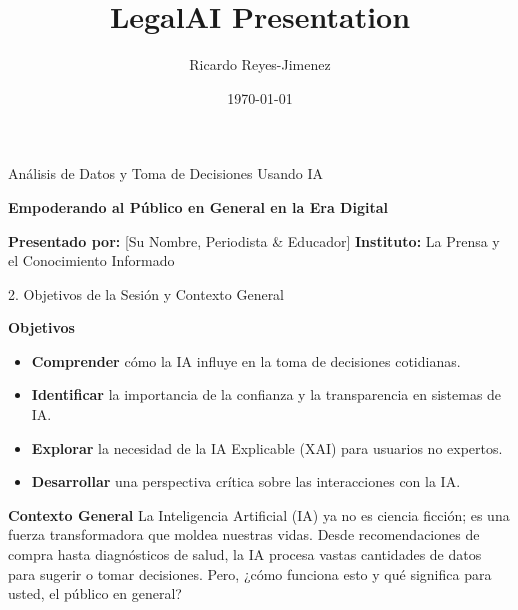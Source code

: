 \documentclass[aspectratio=169]{beamer}
\title[LegalAI Presentation]{LegalAI Presentation}
\subtitle{}
\author{Ricardo Reyes-Jimenez}
\institute{Universidad de La Sabana}
\date{\today}
\begin{document}
\begin{frame}
  \titlepage
\end{frame}

\usebackgroundtemplate{}



\begin{frame}[fragile]{Análisis de Datos y Toma de Decisiones Usando IA}

\textbf{Empoderando al Público en General en la Era Digital}

\textbf{Presentado por:}
[Su Nombre, Periodista \& Educador]
\textbf{Instituto:}
La Prensa y el Conocimiento Informado

\end{frame}



\begin{frame}[fragile]{2. Objetivos de la Sesión y Contexto General}


\textbf{Objetivos}
\begin{itemize}
  \item \textbf{Comprender} cómo la IA influye en la toma de decisiones cotidianas.
  \item \textbf{Identificar} la importancia de la confianza y la transparencia en sistemas de IA.
  \item \textbf{Explorar} la necesidad de la IA Explicable (XAI) para usuarios no expertos.
  \item \textbf{Desarrollar} una perspectiva crítica sobre las interacciones con la IA.
\end{itemize}
\textbf{Contexto General}
La Inteligencia Artificial (IA) ya no es ciencia ficción; es una fuerza transformadora que moldea nuestras vidas. Desde recomendaciones de compra hasta diagnósticos de salud, la IA procesa vastas cantidades de datos para sugerir o tomar decisiones. Pero, ¿cómo funciona esto y qué significa para usted, el público en general?

\end{frame}
\end{document}
